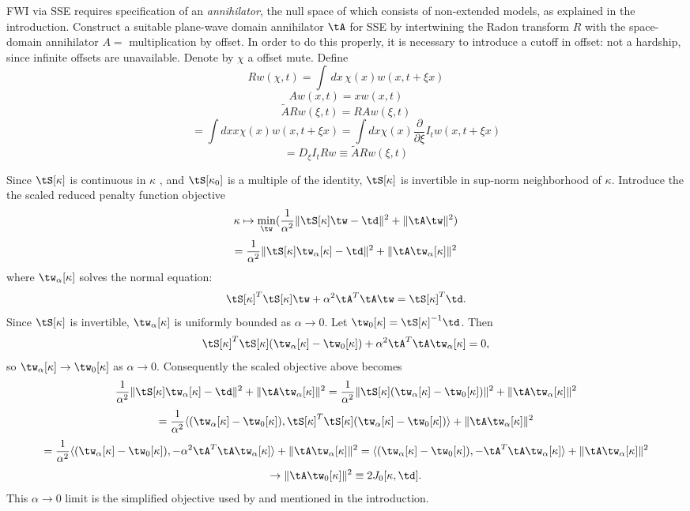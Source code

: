 FWI via SSE requires specification of an {\em annihilator}, the null
space of which consists of non-extended models, as explained in the
introduction.  Construct a suitable plane-wave domain annihilator
$\tA$ for
SSE by intertwining the Radon transform $R$ with the space-domain
annihilator $A = $ multiplication by offset. In order to do this
properly, it is necessary to introduce a cutoff in offset: not a
hardship, since infinite offsets are unavailable. Denote by $\chi$ a
offset mute. Define
\[
Rw(\chi,t) = \int \,dx\,\chi(x) w(x,t+\xi x)
\]
\[
Aw(x,t)=x w(x,t)
\]
\[
\tilde{A} Rw (\xi,t) = R Aw (\xi,t)
\]
\[
=\int dx x \chi(x) w(x,t+\xi x) = \int dx \chi(x)\frac{\partial}{\partial \xi}
I_tw(x,t+\xi x)
\]
\[
= D_{\xi} I_t R  w \equiv \tilde{A} Rw (\xi,t) 
\]

Since $\tS[\kappa]$ is continuous in $\kappa$
\cite[]{BlazekStolkSymes:13}, and $\tS[\kappa_0]$ is a multiple of the
identity, $\tS[\kappa]$ is invertible in sup-norm neighborhood of
$\kappa$. Introduce the the scaled reduced penalty function objective
\[
\kappa \mapsto \min_{\tw}(\frac{1}{\alpha^2}\|\tS[\kappa]\tw-\td\|^2 + \|\tA
\tw\|^2)
\]
\[
=\frac{1}{\alpha^2}\|\tS[\kappa]\tw_{\alpha}[\kappa]-\td\|^2 + \|\tA
\tw_{\alpha}[\kappa]\|^2
\]
where $\tw_{\alpha}[\kappa]$ solves the normal equation:
\[
\tS[\kappa]^T\tS[\kappa]\tw  + \alpha^2\tA^T\tA\tw = \tS[\kappa]^T\td.
\]
Since $\tS[\kappa]$ is invertible, $\tw_{\alpha}[\kappa]$ is uniformly
bounded as $\alpha \rightarrow 0$. Let $\tw_0[\kappa] =
\tS[\kappa]^{-1}\td$. Then
\[
\tS[\kappa]^T\tS[\kappa](\tw_{\alpha}[\kappa]-\tw_0[\kappa])+\alpha^2\tA^T\tA\tw_{\alpha}[\kappa]
= 0,
\]
so $\tw_{\alpha}[\kappa] \rightarrow \tw_0[\kappa]$ as $\alpha
\rightarrow 0$. Consequently the scaled objective above becomes
\[
\frac{1}{\alpha^2}\|\tS[\kappa]\tw_{\alpha}[\kappa]-\td\|^2 + \|\tA 
\tw_{\alpha}[\kappa]\|^2
=\frac{1}{\alpha^2}\|\tS[\kappa](\tw_{\alpha}[\kappa]-\tw_0[\kappa])\|^2 + \|\tA 
\tw_{\alpha}[\kappa]\|^2
\]
\[
=\frac{1}{\alpha^2}\langle (\tw_{\alpha}[\kappa]-\tw_0[\kappa]),
\tS[\kappa]^T\tS[\kappa](\tw_{\alpha}[\kappa]-\tw_0[\kappa])\rangle+ \|\tA 
\tw_{\alpha}[\kappa]\|^2
\]
\[
=\frac{1}{\alpha^2}\langle (\tw_{\alpha}[\kappa]-\tw_0[\kappa]),
-\alpha^2\tA^T\tA \tw_{\alpha}[\kappa] \rangle + \|\tA\tw_{\alpha}[\kappa]\|^2
=\langle (\tw_{\alpha}[\kappa]-\tw_0[\kappa]),
-\tA^T\tA \tw_{\alpha}[\kappa] \rangle + \|\tA\tw_{\alpha}[\kappa]\|^2
\]
\begin{equation}
\label{eqn:j0def}
\rightarrow \|\tA\tw_0[\kappa]\|^2 \equiv 2 J_0[\kappa,\td].
\end{equation}
This $\alpha \rightarrow 0$ limit is the simplified objective used by
\cite{Symes:EAGE15} and mentioned in the introduction.


